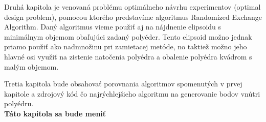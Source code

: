 Druhá kapitola je venovaná problému optimálneho návrhu experimentov (optimal design problem), pomocou ktorého predstavíme algoritmus Randomized Exchange Algorithm. Daný algoritmus vieme použiť aj na nájdnenie elipsoidu s minimálnym objemom obaľujúci zadaný polyéder. Tento elipsoid možno jednak priamo použiť ako nadmnožinu pri zamietacej metóde, no taktiež možno jeho hlavné osi využiť na zistenie natočenia polyédra a obalenie polyédra kvádrom s malým objemom.

Tretia kapitola bude obsahovať porovnania algoritmov spomenutých v prvej kapitole a zdrojový kód čo najrýchlejšieho algoritmu na generovanie bodov vnútri polyédru. \\

\textbf{Táto kapitola sa bude meniť}

